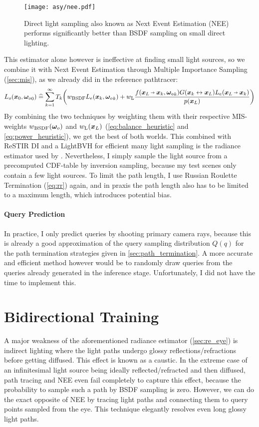 \begin{figure}[ht]
    \centering
    \texttt{[image: asy/nee.pdf]}
\caption{Direct light sampling also known as Next Event Estimation (NEE) performs significantly better than BSDF sampling on small direct lighting.}
\label{fig:nee}
\end{figure}
This estimator alone however is ineffective at finding small light sources, so we combine it with Next Event Estimation through Multiple Importance Sampling (\autoref{sec:mis}), as we already did in the reference pathtracer:
\begin{equation}
\begin{aligned}
    L_o(\vec{x}_0, \wo_0)
    \hateq \sum_{k=1}^{\infty} T_k \left( w_\text{BSDF} L_e(\x_k, \wo_k) + w_\text{L} \frac{f(\pdir{L}{k}, \wo_k) \G{k}{L} L_e(\pdir{L}{k})}{p(\x_L)} \right)
\end{aligned}
\end{equation}
By combining the two techniques by weighting them with their respective MIS-weights $w_\text{BSDF}({\bm{\omega}_o})$ and $w_\text{L}(\bm{x}_L)$ (\autoref{eq:balance_heuristic} and \autoref{eq:power_heuristic}), we get the best of both worlds.
This combined with ReSTIR DI  and a LightBVH  for efficient many light sampling is the radiance estimator used by \textcite{muller2021}.
Nevertheless, I simply sample the light source from a precomputed CDF-table by inversion sampling, because my test scenes only contain a few light sources.
To limit the path length, I use Russian Roulette Termination (\autoref{eq:rr}) again, and in praxis the path length also has to be limited to a maximum length, which introduces potential bias.

\paragraph{Query Prediction}
In practice, I only predict queries by shooting primary camera rays, because this is already a good approximation of the query sampling distribution $Q(q)$ for the path termination strategies given in \autoref{sec:path_termination}.
A more accurate and efficient method however would be to randomly draw queries from the queries already generated in the inference stage.
Unfortunately, I did not have the time to implement this.

\section{Bidirectional Training}
\label{sec:re_bidir}
A major weakness of the aforementioned radiance estimator (\autoref{sec:re_eye}) is indirect lighting where the light paths undergo glossy reflections/refractions before getting diffused.
This effect is known as a caustic.
In the extreme case of an infinitesimal light source being ideally reflected/refracted and then diffused, path tracing and NEE even fail completely to capture this effect, because the probability to sample such a path by BSDF sampling is zero.
However, we can do the exact opposite of NEE by tracing light paths and connecting them to query points sampled from the eye.
This technique elegantly resolves even long glossy light paths.

